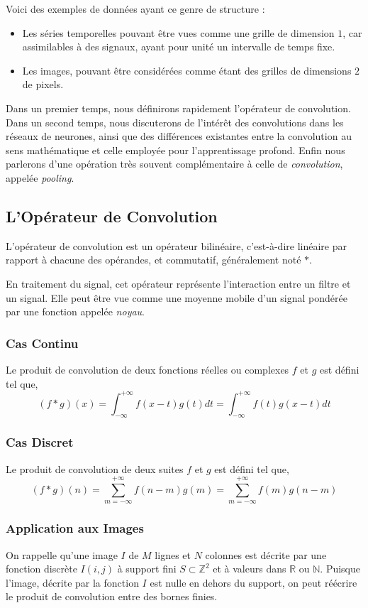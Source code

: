 \documentclass[a4paper, 11pt]{report}
\begin{document}
Voici des exemples de données ayant ce genre de structure :
\begin{itemize}
	\item Les séries temporelles pouvant être vues comme une grille de dimension $1$, car assimilables à des signaux, ayant pour unité un intervalle de temps fixe.
	\item Les images, pouvant être considérées comme étant des grilles de dimensions $2$ de pixels.
\end{itemize}
Dans un premier temps, nous définirons rapidement l'opérateur de convolution.
Dans un second temps, nous discuterons de l'intérêt des convolutions dans les réseaux de neurones, ainsi que des différences existantes entre la convolution au sens mathématique et celle employée pour l'apprentissage profond.
Enfin nous parlerons d'une opération très souvent complémentaire à celle de \emph{convolution}, appelée \emph{pooling}.
\subsection{L'Opérateur de Convolution}
L'opérateur de convolution est un opérateur bilinéaire, c'est-à-dire linéaire par rapport à chacune des opérandes, et commutatif, généralement noté $*$.

En traitement du signal, cet opérateur représente l’interaction entre un filtre et un signal.
Elle peut être vue comme une moyenne mobile d'un signal pondérée par une fonction appelée \emph{noyau}.
\subsubsection{Cas Continu}
Le produit de convolution de deux fonctions réelles ou complexes $f$ et $g$ est défini tel que,
$$(f * g)(x) = \int_{-\infty}^{+\infty}{f(x-t)g(t)dt} = \int_{-\infty}^{+\infty}{f(t)g(x-t)dt}$$
\subsubsection{Cas Discret}
Le produit de convolution de deux suites $f$ et $g$ est défini tel que,
$$(f *g)(n) = \sum_{m = -\infty}^{+\infty}{f(n-m)g(m)} = \sum_{m = -\infty}^{+\infty}{f(m)g(n-m)}$$
\subsubsection{Application aux Images}
On rappelle qu'une image $I$ de $M$ lignes et $N$ colonnes est décrite par une fonction discrète $I(i,j)$ à support fini $S \subset \mathbb{Z}^2$ et à valeurs dans $\mathbb{R}$ ou $\mathbb{N}$.
Puisque l'image, décrite par la fonction $I$ est nulle en dehors du support, on peut réécrire le produit de convolution entre des bornes finies.
\end{document}
